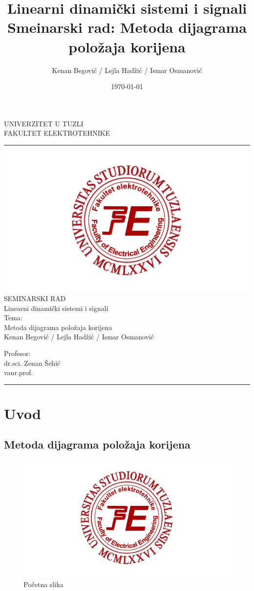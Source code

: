 \documentclass[a4paper,12pt]{article}
\title{Linearni dinamički sistemi i signali \\ Smeinarski rad: Metoda dijagrama položaja korijena}
\author{Kenan Begović / Lejla Hadžić  / Ismar Osmanović}
\date{\today}
\begin{document}
\begin{center}
\thispagestyle{empty}
\large{UNIVERZITET U TUZLI \\ FAKULTET ELEKTROTEHNIKE}

\noindent\rule[7pt]{\linewidth}{0.4pt}


 \includegraphics[width=0.7\linewidth]{img/fet_logo.png}
\vspace{3cm}\\
{\fontsize{34pt}{28pt}\selectfont SEMINARSKI RAD}\\
\large{Linearni dinamički sistemi i signali }\\
\vspace{2cm}
\Huge{Tema:}\\
\Huge{Metoda dijagrama položaja korijena}\\
\vspace{0.5cm}
\large{Kenan Begović / Lejla Hadžić  / Ismar Osmanović}
\vfill

\noindent\hfill
\begin{minipage}[t]{0.33\textwidth}
\begin{flushright}
Profesor:\\
dr.sci. Zenan Šehić\\
vanr.prof.
\end{flushright}
\end{minipage}
\vspace{1cm}

\noindent\rule[7pt]{\linewidth}{0.4pt}
\end{center}
\newpage
\thispagestyle{empty}
\tableofcontents
\newpage
{} 

\section{Uvod}
\newpage
\subsection{Metoda dijagrama položaja korijena}
\begin{figure}[h]
    \centering
    \includegraphics[width=\textwidth]{img/fet_logo.png}
    \caption{Početna slika}
    \label{fig:example}
\end{figure}
\end{document}
